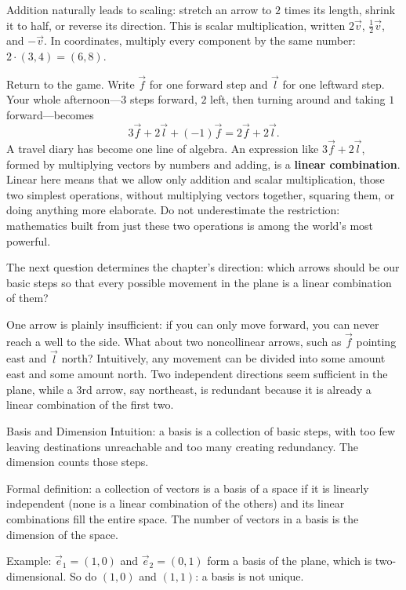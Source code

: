 Addition naturally leads to scaling: stretch an arrow to $2$ times its length, shrink it to half, or reverse its direction. This is scalar multiplication, written $2\vec{v}$, $\tfrac{1}{2}\vec{v}$, and $-\vec{v}$. In coordinates, multiply every component by the same number: $2\cdot(3,4)=(6,8)$.

Return to the game. Write $\vec{f}$ for one forward step and $\vec{l}$ for one leftward step. Your whole afternoon---$3$ steps forward, $2$ left, then turning around and taking $1$ forward---becomes
\[
3\vec{f}+2\vec{l}+(-1)\vec{f}=2\vec{f}+2\vec{l}.
\]
A travel diary has become one line of algebra. An expression like $3\vec{f}+2\vec{l}$, formed by multiplying vectors by numbers and adding, is a \textbf{linear combination}. Linear here means that we allow only addition and scalar multiplication, those two simplest operations, without multiplying vectors together, squaring them, or doing anything more elaborate. Do not underestimate the restriction: mathematics built from just these two operations is among the world's most powerful.

The next question determines the chapter's direction: which arrows should be our basic steps so that every possible movement in the plane is a linear combination of them?

One arrow is plainly insufficient: if you can only move forward, you can never reach a well to the side. What about two noncollinear arrows, such as $\vec{f}$ pointing east and $\vec{l}$ north? Intuitively, any movement can be divided into some amount east and some amount north. Two independent directions seem sufficient in the plane, while a $3$rd arrow, say northeast, is redundant because it is already a linear combination of the first two.

\begin{shuyu}{Basis and Dimension}
Intuition: a basis is a collection of basic steps, with too few leaving destinations unreachable and too many creating redundancy. The dimension counts those steps.

Formal definition: a collection of vectors is a basis of a space if it is linearly independent (none is a linear combination of the others) and its linear combinations fill the entire space. The number of vectors in a basis is the dimension of the space.

Example: $\vec{e}_1=(1,0)$ and $\vec{e}_2=(0,1)$ form a basis of the plane, which is two-dimensional. So do $(1,0)$ and $(1,1)$: a basis is not unique.
\end{shuyu}

